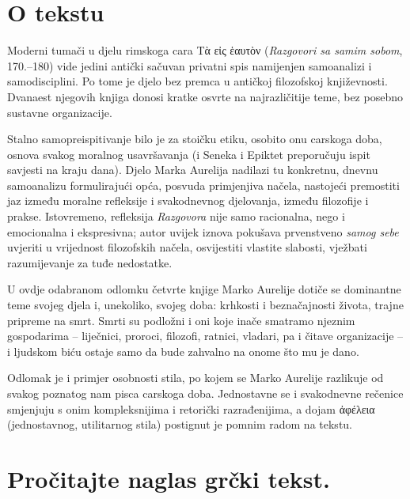 


\section*{O tekstu}

Moderni tumači u djelu rimskoga cara \textgreek[variant=ancient]{Tὰ εἰς ἑαυτὸν} (\textit{Razgovori sa samim sobom}, 170.–180) vide jedini antički sačuvan privatni spis namijenjen samoanalizi i samodisciplini. Po tome je djelo bez premca u antičkoj filozofskoj književnosti. Dvanaest njegovih knjiga donosi kratke osvrte na najrazličitije teme, bez posebno sustavne organizacije.

Stalno samopreispitivanje bilo je za stoičku etiku, osobito onu carskoga doba, osnova svakog moralnog usavršavanja (i Seneka i Epiktet preporučuju ispit savjesti na kraju dana). Djelo Marka Aurelija nadilazi tu konkretnu, dnevnu samoanalizu formulirajući opća, posvuda primjenjiva načela, nastojeći premostiti jaz između moralne refleksije i svakodnevnog djelovanja, između filozofije i prakse. Istovremeno, refleksija \textit{Razgovora} nije samo racionalna, nego i emocionalna i ekspresivna; autor uvijek iznova pokušava prvenstveno \textit{samog sebe} uvjeriti u vrijednost filozofskih načela, osvijestiti vlastite slabosti, vježbati razumijevanje za tuđe nedostatke.

U ovdje odabranom odlomku četvrte knjige Marko Aurelije dotiče se dominantne teme svojeg djela i, unekoliko, svojeg doba: krhkosti i beznačajnosti života, trajne pripreme na smrt. Smrti su podložni i oni koje inače smatramo njeznim gospodarima – liječnici, proroci, filozofi, ratnici, vladari, pa i čitave organizacije – i ljudskom biću ostaje samo da bude zahvalno na onome što mu je dano.

Odlomak je i primjer osobnosti stila, po kojem se Marko Aurelije razlikuje od svakog poznatog nam pisca carskoga doba. Jednostavne se i svakodnevne rečenice smjenjuju s onim kompleksnijima i retorički razrađenijima, a dojam \textgreek[variant=ancient]{ἀφέλεια} (jednostavnog, utilitarnog stila) postignut je pomnim radom na tekstu.


\section*{Pročitajte naglas grčki tekst.}

